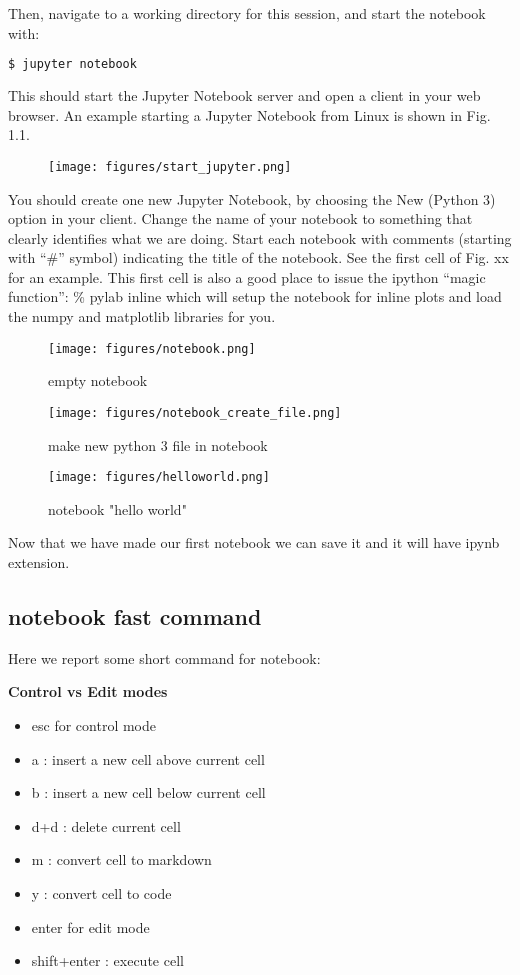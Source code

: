 \documentclass[11pt]{book}
\begin{document}
Then, navigate to a working directory for this session, and start the notebook with:

\begin{lstlisting}[language=bash]
$ jupyter notebook
\end{lstlisting}

This should start the Jupyter Notebook server and open a client in your web browser.  An example starting a Jupyter Notebook from Linux is shown in Fig. 1.1.

\begin{figure}[!]
\texttt{[image: figures/start\_jupyter.png]}
\end{figure}

You should create one new Jupyter Notebook, by choosing the New (Python 3) option in your client.  Change the name of your notebook to something that clearly identifies what we are doing.  Start each notebook with comments (starting with “\#” symbol) indicating the title of the notebook.  See the first cell of Fig. xx for an example.  This first cell is also a good place to issue the ipython “magic function”: \%{} pylab inline which will setup the notebook for inline plots and load the numpy and matplotlib libraries for you.

\begin{figure}[!]
\texttt{[image: figures/notebook.png]}
\caption{empty notebook}
\end{figure}

\begin{figure}[!]
\texttt{[image: figures/notebook\_create\_file.png]}
\caption{make new python 3 file in notebook}
\end{figure}

\begin{figure}[!]
\texttt{[image: figures/helloworld.png]}
\caption{notebook "hello world"}
\end{figure}

Now that we have made our first notebook we can save it and it will have ipynb extension.


\subsection{notebook fast command}
Here we report some short command for notebook:

{\bf Control vs Edit modes}
\begin{itemize}
\item esc for control mode
\item a : insert a new cell above current cell
\item b : insert a new cell below current cell
\item d+d : delete current cell
\item m : convert cell to markdown
\item y : convert cell to code
\item enter for edit mode
\item shift+enter : execute cell
\end{itemize}
\end{document}
